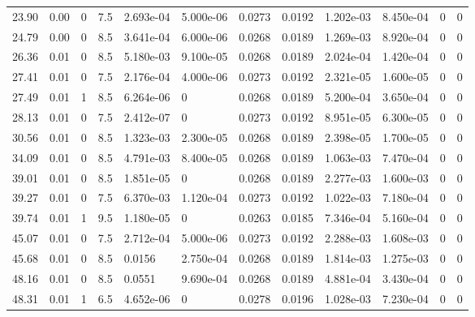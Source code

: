 \documentclass[preview]{standalone}
\begin{document}
{{\begin{tabular}{L{1.2cm}C{1.2cm} C{0.3cm}C{0.5cm} C{1.4cm}C{1.4cm} C{1.4cm}C{1.4cm} C{1.6cm}C{1.6cm} C{1.6cm}C{1.6cm}}
  23.90  &  0.00  & 0     & 7.5 &  2.693e-04  & 5.000e-06  &  0.0273&   0.0192& 1.202e-03 & 8.450e-04   &  0 & 0  \\ 
  24.79  &  0.00  & 0     & 8.5 &  3.641e-04  & 6.000e-06  &  0.0268&   0.0189& 1.269e-03 & 8.920e-04   &  0 & 0  \\ 
  26.36  &  0.01  & 0     & 8.5 &  5.180e-03  & 9.100e-05  &  0.0268&   0.0189& 2.024e-04 & 1.420e-04   &  0 & 0  \\ 
  27.41  &  0.01  & 0     & 7.5 &  2.176e-04  & 4.000e-06  &  0.0273&   0.0192& 2.321e-05 & 1.600e-05   &  0 & 0  \\ 
  27.49  &  0.01  & 1     & 8.5 &  6.264e-06  & 0  &  0.0268&   0.0189& 5.200e-04 & 3.650e-04   &  0 & 0  \\ 
  28.13  &  0.01  & 0     & 7.5 &  2.412e-07  & 0  &  0.0273&   0.0192& 8.951e-05 & 6.300e-05   &  0 & 0  \\ 
  30.56  &  0.01  & 0     & 8.5 &  1.323e-03  & 2.300e-05  &  0.0268&   0.0189& 2.398e-05 & 1.700e-05   &  0 & 0  \\ 
  34.09  &  0.01  & 0     & 8.5 &  4.791e-03  & 8.400e-05  &  0.0268&   0.0189& 1.063e-03 & 7.470e-04   &  0 & 0  \\ 
  39.01  &  0.01  & 0     & 8.5 &  1.851e-05  & 0  &  0.0268&   0.0189& 2.277e-03 & 1.600e-03   &  0 & 0  \\ 
  39.27  &  0.01  & 0     & 7.5 &  6.370e-03  & 1.120e-04  &  0.0273&   0.0192& 1.022e-03 & 7.180e-04   &  0 & 0  \\ 
  39.74  &  0.01  & 1     & 9.5 &  1.180e-05  & 0  &  0.0263&   0.0185& 7.346e-04 & 5.160e-04   &  0 & 0  \\ 
  45.07  &  0.01  & 0     & 7.5 &  2.712e-04  & 5.000e-06  &  0.0273&   0.0192& 2.288e-03 & 1.608e-03   &  0 & 0  \\ 
  45.68  &  0.01  & 0     & 8.5 &  0.0156  & 2.750e-04  &  0.0268&   0.0189& 1.814e-03 & 1.275e-03   &  0 & 0  \\ 
  48.16  &  0.01  & 0     & 8.5 &  0.0551  & 9.690e-04  &  0.0268&   0.0189& 4.881e-04 & 3.430e-04   &  0 & 0  \\ 
  48.31  &  0.01  & 1     & 6.5 &  4.652e-06  & 0  &  0.0278&   0.0196& 1.028e-03 & 7.230e-04   &  0 & 0  \\ 
\hline 
\end{tabular} 

}}
\end{document}
